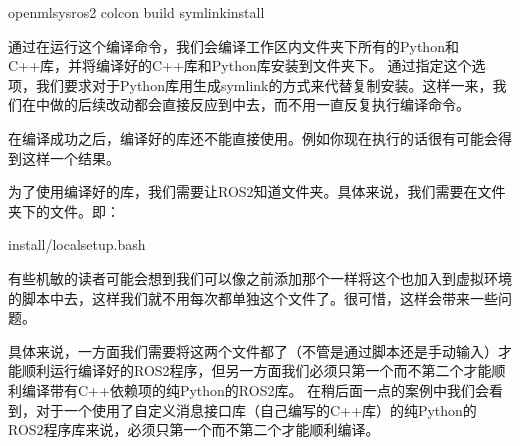 \documentclass[letterpaper,10pt,english]{sphinxmanual}
\begin{document}
\begin{sphinxVerbatim}[commandchars=\\\{\}]
 openmlsys\PYGZhy{}ros2
colcon build \PYGZhy{}\PYGZhy{}symlink\PYGZhy{}install
\end{sphinxVerbatim}

\sphinxAtStartPar
通过在运行这个编译命令，我们会编译工作区内文件夹下所有的Python和C++库，并将编译好的C++库和Python库安装到文件夹下。
通过指定这个选项，我们要求对于Python库用生成symlink的方式来代替复制安装。这样一来，我们在中做的后续改动都会直接反应到中去，而不用一直反复执行编译命令。

\sphinxAtStartPar
在编译成功之后，编译好的库还不能直接使用。例如你现在执行的话很有可能会得到这样一个结果。

\sphinxAtStartPar
为了使用编译好的库，我们需要让ROS2知道文件夹。具体来说，我们需要在文件夹下的文件。即：

\begin{sphinxVerbatim}[commandchars=\\\{\}]
 install/local\PYGZus{}setup.bash
\end{sphinxVerbatim}

\sphinxAtStartPar
有些机敏的读者可能会想到我们可以像之前添加那个一样将这个也加入到虚拟环境的脚本中去，这样我们就不用每次都单独这个文件了。很可惜，这样会带来一些问题。

\sphinxAtStartPar
具体来说，一方面我们需要将这两个文件都了（不管是通过脚本还是手动输入）才能顺利运行编译好的ROS2程序，但另一方面我们必须只第一个而不第二个才能顺利编译带有C++依赖项的纯Python的ROS2库。
在稍后面一点的案例中我们会看到，对于一个使用了自定义消息接口库（自己编写的C++库）的纯Python的ROS2程序库来说，必须只第一个而不第二个才能顺利编译。
\end{document}
